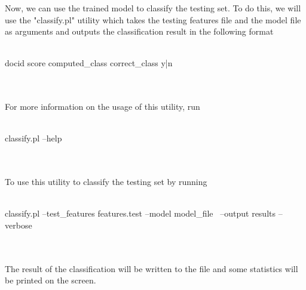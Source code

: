 Now, we can use the trained model to classify the testing set. To do this, we will use the "classify.pl" utility which takes the testing features file and the model file as arguments and outputs the classification result in the following format
\\
\\
\begin{boxedverbatim}
 docid   score   computed_class   correct_class   y|n
\end{boxedverbatim}
\\
\\
For more information on the usage of this utility, run
\\
\\
\begin{boxedverbatim}
 classify.pl --help
\end{boxedverbatim}
\\
\\
To use this utility to classify the testing set by running
\\
\\
\begin{boxedverbatim}
 classify.pl --test_features features.test --model model_file \
 --output results --verbose
\end{boxedverbatim}
\\
\\
The result of the classification will be written to the file and some statistics will be printed on the screen. 